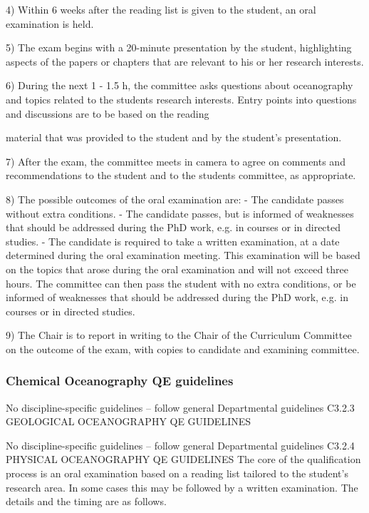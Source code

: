 \documentclass{article}
\begin{document}
4)	Within 6 weeks after the reading list is given to the student, an oral examination is held.

5)	The exam begins with a 20-minute presentation by the student, highlighting aspects of the papers or chapters that are relevant to his or her research interests.

6)	During the next 1 - 1.5 h, the committee asks questions about oceanography and topics related to the students research interests. Entry points into questions and discussions are to be based on the reading
 

material that was provided to the student and by the student’s presentation.

7)	After the exam, the committee meets in camera to agree on comments and recommendations to the student and to the students committee, as appropriate.

8)	The possible outcomes of the oral examination are:
-	The candidate passes without extra conditions.
-	The candidate passes, but is informed of weaknesses that should be addressed during the PhD work,
e.g. in courses or in directed studies.
-	The candidate is required to take a written examination, at a date determined during the oral examination meeting. This examination will be based on the topics that arose during the oral examination and will not exceed three hours. The committee can then pass the student with no extra conditions, or be informed of weaknesses that should be addressed during the PhD work, e.g. in courses or in directed studies.

9)	The Chair is to report in writing to the Chair of the Curriculum Committee on the outcome of the exam, with copies to candidate and examining committee.


\subsubsection{Chemical Oceanography QE guidelines}

No discipline-specific guidelines – follow general Departmental guidelines
C3.2.3  GEOLOGICAL OCEANOGRAPHY QE GUIDELINES

No discipline-specific guidelines – follow general Departmental guidelines
C3.2.4  PHYSICAL OCEANOGRAPHY QE GUIDELINES
The core of the qualification process is an oral examination based on a reading list tailored to the student’s research area. In some cases this may be followed by a written examination. The details and the timing are as follows.
\end{document}
